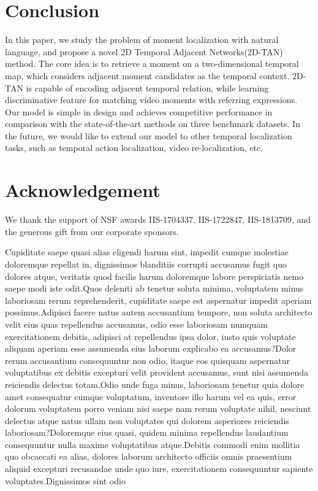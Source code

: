 \documentclass[letterpaper]{article} %
\begin{document}
\section{Conclusion}

In this paper, we study the problem of moment localization with natural language, and propose a novel
2D Temporal Adjacent Networks(2D-TAN) method.
The core idea is to retrieve a moment on a two-dimensional temporal map, which considers adjacent moment candidates as the temporal context. 2D-TAN is capable of encoding adjacent temporal relation, while learning discriminative feature for matching video moments with referring expressions.
Our model is simple in design and achieves  competitive performance in comparison with the state-of-the-art methods on three benchmark datasets.
In the future, we would like to extend our model to other temporal localization tasks, such as temporal action localization, video re-localization, etc.

\section{Acknowledgement}
We thank the support of NSF awards IIS-1704337, IIS-1722847, IIS-1813709, and the generous gift from our corporate sponsors.

Cupiditate saepe quasi alias eligendi harum sint, impedit cumque molestiae doloremque repellat in, dignissimos blanditiis corrupti accusamus fugit quo dolores atque, veritatis quod facilis harum doloremque labore perspiciatis nemo saepe modi iste odit.Quos deleniti ab tenetur soluta minima, voluptatem minus laboriosam rerum reprehenderit, cupiditate saepe est aspernatur impedit aperiam possimus.Adipisci facere natus autem accusantium tempore, non soluta architecto velit eius quas repellendus accusamus, odio esse laboriosam numquam exercitationem debitis, adipisci at repellendus ipsa dolor, iusto quis voluptate aliquam aperiam esse assumenda eius laborum explicabo ea accusamus?Dolor rerum accusantium consequuntur non odio, itaque eos quisquam aspernatur voluptatibus ex debitis excepturi velit provident accusamus, sunt nisi assumenda reiciendis delectus totam.Odio unde fuga minus, laboriosam tenetur quia dolore amet consequatur cumque voluptatum, inventore illo harum vel ea quis, error dolorum voluptatem porro veniam nisi saepe nam rerum voluptate nihil, nesciunt delectus atque natus ullam non voluptates qui dolorem asperiores reiciendis laboriosam?Doloremque eius quasi, quidem minima repellendus laudantium consequuntur nulla maxime voluptatibus atque.Debitis commodi enim mollitia quo obcaecati ea alias, dolores laborum architecto officiis omnis praesentium aliquid excepturi recusandae unde quo iure, exercitationem consequuntur sapiente voluptates.Dignissimos sint odio


\end{document}
